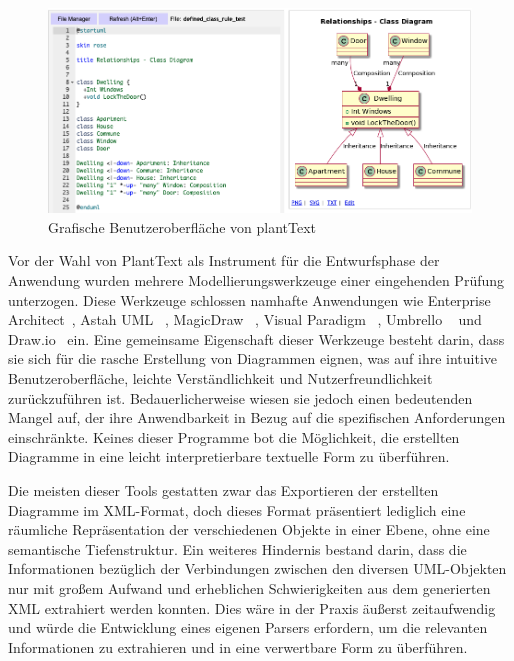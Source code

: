 \begin{figure}
    \centering
    \includegraphics[width=15cm]{images/plantText}
    \caption{Grafische Benutzeroberfläche von plantText}
    \label{fig:plant-text}
\end{figure}

Vor der Wahl von PlantText als Instrument für die Entwurfsphase der Anwendung wurden mehrere Modellierungswerkzeuge
einer eingehenden Prüfung unterzogen. Diese Werkzeuge schlossen namhafte Anwendungen wie Enterprise Architect~\cite{enterarch},
Astah UML ~\cite{astah}, MagicDraw ~\cite{magic}, Visual Paradigm ~\cite{visual}, Umbrello ~\cite{umbrello} und Draw.io~\cite{draw} ein.
Eine gemeinsame Eigenschaft dieser Werkzeuge besteht darin, dass sie sich für die rasche Erstellung von Diagrammen
eignen, was auf ihre intuitive Benutzeroberfläche, leichte Verständlichkeit und Nutzerfreundlichkeit zurückzuführen ist.
Bedauerlicherweise wiesen sie jedoch einen bedeutenden Mangel auf, der ihre Anwendbarkeit in Bezug auf die spezifischen
Anforderungen einschränkte. Keines dieser Programme bot die Möglichkeit, die erstellten Diagramme in eine
leicht interpretierbare textuelle Form zu überführen.

Die meisten dieser Tools gestatten zwar das Exportieren der erstellten Diagramme im XML-Format, doch dieses Format
präsentiert lediglich eine räumliche Repräsentation der verschiedenen Objekte in einer Ebene, ohne eine semantische
Tiefenstruktur. Ein weiteres Hindernis bestand darin, dass die Informationen bezüglich der Verbindungen zwischen den
diversen UML-Objekten nur mit großem Aufwand und erheblichen Schwierigkeiten aus dem generierten XML extrahiert werden
konnten. Dies wäre in der Praxis äußerst zeitaufwendig und würde die Entwicklung eines eigenen Parsers erfordern, um die
relevanten Informationen zu extrahieren und in eine verwertbare Form zu überführen.


